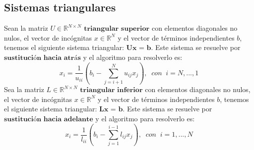 \subsection{Sistemas triangulares}
Sean la matriz $U \in \mathbb{R}^{N \times N}$ $\textbf{triangular superior}$ con elementos diagonales no nulos, el vector de incógnitas $x \in \mathbb{R}^N$ y el vector de términos independientes $b$, tenemos el siguiente sistema triangular: $\textbf{Ux = b}$. Este sistema se resuelve por $\textbf{sustitución hacia atrás}$ y el algoritmo para resolverlo es:
\[ x_i = \frac{1}{u_{ii}} \left( b_i - \sum _{j=i+1}^N u_{ij}x_j \right), \; \; con \; \; i = N,...,1 \]
Sea la matriz $L \in \mathbb{R}^{N \times N}$  $\textbf{triangular inferior}$ con elementos diagonales no nulos, el vector de incógnitas $x \in \mathbb{R}^N$ y el vector de términos independientes $b$, tenemos el siguiente sistema triangular: $\textbf{Lx = b}$. Este sistema se resuelve por $\textbf{sustitución hacia adelante}$ y el algoritmo para resolverlo es:
\[ x_i = \frac{1}{l_{ii}} \left( b_i - \sum _{j=1}^{i-1} l_{ij}x_j \right), \; \; con \; \; i = 1,...,N \]
		
